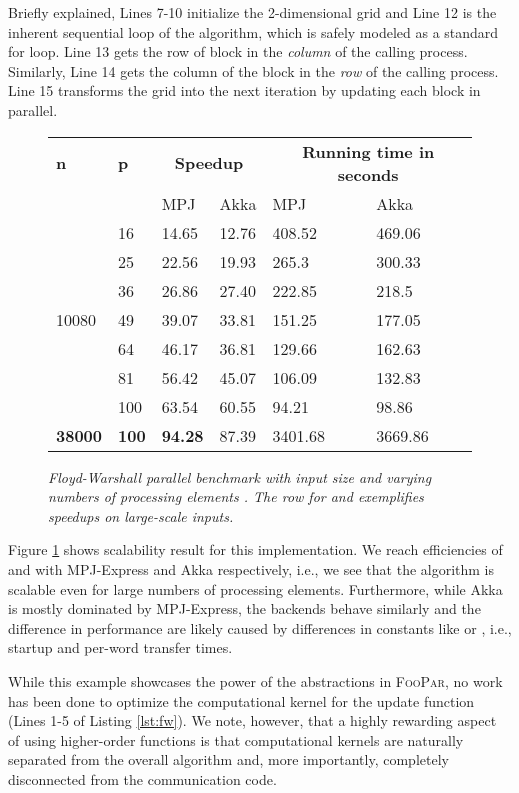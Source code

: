 \documentclass{article}
\newcommand{\framework}{{\rmfamily\scshape FooPar}\xspace}
\begin{document}
{\begin{algorithm}
{\noindent Briefly explained, Lines 7-10 initialize the 2-dimensional grid and Line 12 is
the inherent sequential loop of the algorithm, which is safely modeled as
a standard for loop. 
Line 13 gets the row  of block  in
the \textit{column} of the calling process.
Similarly, Line 14 gets the column  of the block  in the \textit{row} of the calling process.
Line 15 transforms the grid into the next iteration by updating each block in parallel.

 \begin{figure}[t]
\centering
\begin{tabular}{|l|l||l|l||l|l|}\hline
 \textbf{n} & \textbf{p}& \multicolumn{2}{|c||}{\textbf{Speedup}}& \multicolumn{2}{|c|}{\textbf{Running time in seconds}} \\ & &  MPJ & Akka & MPJ & Akka \\\hline
 \multirow{7}{*}{10080} & 16 &14.65 & 12.76&408.52 &469.06 \\ 
  & 25  &22.56 &19.93&265.3 &300.33 \\ 
  & 36  &26.86&27.40 &222.85 &218.5 \\ 
  & 49  &39.07& 33.81&151.25 &177.05 \\ 
  & 64  &46.17& 36.81&129.66 &162.63 \\ 
  & 81  &56.42&45.07&106.09 &132.83 \\ 
  & 100  &63.54& 60.55&94.21 &98.86 \\ \hline\hline
  \textbf{38000}& \textbf{100} & \textbf{94.28} & 87.39 & 3401.68 & 3669.86 \\ \hline
\end{tabular}

\caption{\it Floyd-Warshall parallel benchmark with input size   and varying numbers of processing elements .
The row for  and  exemplifies speedups on large-scale inputs.} 
\label{fig:floydresults}
\end{figure}
Figure \ref{fig:floydresults} shows scalability result for this implementation. We reach efficiencies of  and  with MPJ-Express and Akka respectively,
i.e., we see that the algorithm is scalable even for large numbers of processing elements. Furthermore, while Akka is mostly dominated by MPJ-Express, the backends behave similarly and the difference in performance 
are likely caused by differences in constants like  or , i.e., startup and per-word transfer times. 

While this example showcases the power of the abstractions in \framework, no work has been done to optimize the computational kernel for the update function (Lines 1-5 of Listing \ref{lst:fw}). We note, however, that 
a highly rewarding aspect of using higher-order functions is that computational kernels are naturally separated from the overall algorithm and, more importantly, completely disconnected from the communication code.

}
\end{algorithm}}
\end{document}
